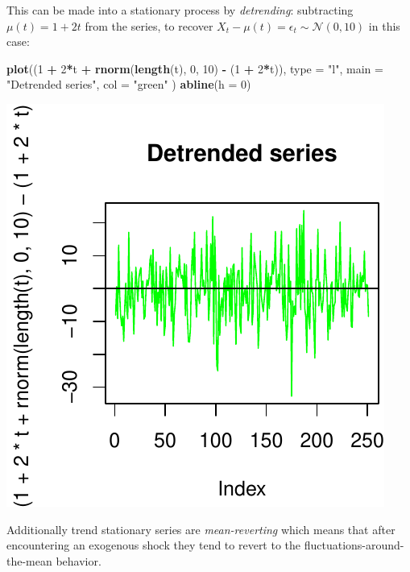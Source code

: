 \documentclass[11pt,]{article}
\newenvironment{Shaded}{\begin{snugshade}}{\end{snugshade}}
\newcommand{\KeywordTok}[1]{\textcolor[rgb]{0.13,0.29,0.53}{\textbf{#1}}}
\newcommand{\DataTypeTok}[1]{\textcolor[rgb]{0.13,0.29,0.53}{#1}}
\newcommand{\DecValTok}[1]{\textcolor[rgb]{0.00,0.00,0.81}{#1}}
\newcommand{\StringTok}[1]{\textcolor[rgb]{0.31,0.60,0.02}{#1}}
\newcommand{\OperatorTok}[1]{\textcolor[rgb]{0.81,0.36,0.00}{\textbf{#1}}}
\newcommand{\NormalTok}[1]{#1}
\begin{document}
This can be made into a stationary process by \emph{detrending}:
subtracting \(\mu(t) = 1+2t\) from the series, to recover
\(X_t-\mu(t)=\epsilon_t\sim \mathcal{N}(0, 10)\) in this case:

\begin{Shaded}
\begin{Highlighting}[]
\KeywordTok{plot}\NormalTok{((}\DecValTok{1} \OperatorTok{+}\StringTok{ }\DecValTok{2}\OperatorTok{*}\NormalTok{t }\OperatorTok{+}\StringTok{ }\KeywordTok{rnorm}\NormalTok{(}\KeywordTok{length}\NormalTok{(t), }\DecValTok{0}\NormalTok{, }\DecValTok{10}\NormalTok{) }\OperatorTok{-}\StringTok{ }\NormalTok{(}\DecValTok{1} \OperatorTok{+}\StringTok{ }\DecValTok{2}\OperatorTok{*}\NormalTok{t)),}
     \DataTypeTok{type =} \StringTok{"l"}\NormalTok{,}
     \DataTypeTok{main =} \StringTok{"Detrended series"}\NormalTok{,}
     \DataTypeTok{col =} \StringTok{"green"}
\NormalTok{     )}
\KeywordTok{abline}\NormalTok{(}\DataTypeTok{h =} \DecValTok{0}\NormalTok{)}
\end{Highlighting}
\end{Shaded}

\begin{center}\includegraphics{FMC_T4_PhD_Fin_Time_Series_files/figure-latex/detrend-1} \end{center}

Additionally trend stationary series are \emph{mean-reverting} which
means that after encountering an exogenous shock they tend to revert to
the fluctuations-around-the-mean behavior.
\end{document}
